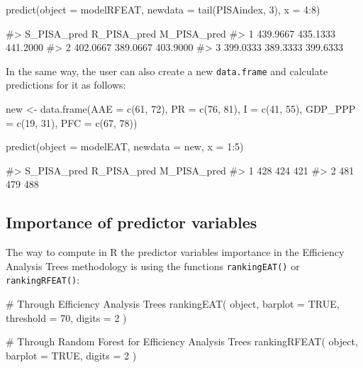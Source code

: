 \begin{Schunk}
\begin{Sinput}
predict(object = modelRFEAT, newdata = tail(PISAindex, 3), x = 4:8)
\end{Sinput}
\begin{Soutput}
#>   S_PISA_pred R_PISA_pred M_PISA_pred
#> 1    439.9667    435.1333    441.2000
#> 2    402.0667    389.0667    403.9000
#> 3    399.0333    389.3333    399.6333
\end{Soutput}
\end{Schunk}

In the same way, the user can also create a new \texttt{data.frame} and
calculate predictions for it as follows:

\begin{Schunk}
\begin{Sinput}
new <- data.frame(AAE = c(61, 72), PR = c(76, 81), I = c(41, 55), GDP_PPP = c(19, 31),
                  PFC = c(67, 78))
                  
predict(object = modelEAT, newdata = new, x = 1:5)
\end{Sinput}
\begin{Soutput}
#>   S_PISA_pred R_PISA_pred M_PISA_pred
#> 1         428         424         421
#> 2         481         479         488
\end{Soutput}
\end{Schunk}

\hypertarget{importance-of-predictor-variables}{%
\subsection{Importance of predictor
variables}\label{importance-of-predictor-variables}}

The way to compute in R the predictor variables importance in the
Efficiency Analysis Trees methodology is using the functions
\texttt{rankingEAT()} or \texttt{rankingRFEAT()}:

\begin{Schunk}
\begin{Sinput}
# Through Efficiency Analysis Trees
rankingEAT(
  object,
  barplot = TRUE,
  threshold = 70,
  digits = 2
)

# Through Random Forest for Efficiency Analysis Trees
rankingRFEAT(
  object,
  barplot = TRUE,
  digits = 2
)
\end{Sinput}
\end{Schunk}

